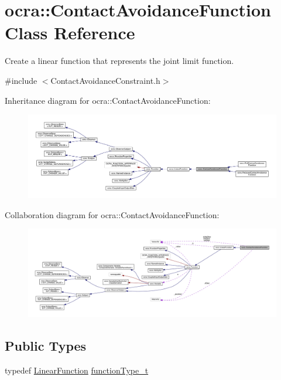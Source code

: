 \hypertarget{classocra_1_1ContactAvoidanceFunction}{}\section{ocra\+:\+:Contact\+Avoidance\+Function Class Reference}
\label{classocra_1_1ContactAvoidanceFunction}


Create a linear function that represents the joint limit function.  




{\ttfamily \#include $<$Contact\+Avoidance\+Constraint.\+h$>$}



Inheritance diagram for ocra\+:\+:Contact\+Avoidance\+Function\+:\nopagebreak
\begin{figure}[H]
\begin{center}
\leavevmode
\includegraphics[width=350pt]{d5/d61/classocra_1_1ContactAvoidanceFunction__inherit__graph}
\end{center}
\end{figure}


Collaboration diagram for ocra\+:\+:Contact\+Avoidance\+Function\+:\nopagebreak
\begin{figure}[H]
\begin{center}
\leavevmode
\includegraphics[width=350pt]{d3/d88/classocra_1_1ContactAvoidanceFunction__coll__graph}
\end{center}
\end{figure}
\subsection*{Public Types}
\begin{DoxyCompactItemize}
\item 
typedef \hyperlink{classocra_1_1LinearFunction}{Linear\+Function} \hyperlink{classocra_1_1ContactAvoidanceFunction_a15d14e0a9e8810d1a6990d5ab7e179ab}{function\+Type\+\_\+t}
\end{DoxyCompactItemize}
